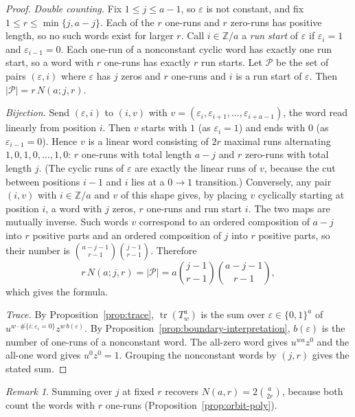 \documentclass[10pt,a4paper]{article}
\numberwithin{equation}{section}
\theoremstyle{plain}
\theoremstyle{definition}
\theoremstyle{remark}
\newtheorem{remark}[theorem]{Remark}
\begin{document}
\begin{proof}
\emph{Double counting.} Fix $1\le j\le a-1$, so $\varepsilon$ is not constant,
and fix $1\le r\le\min\{j,a-j\}$. Each of the $r$ one-runs and $r$ zero-runs has
positive length, so no such words exist for larger $r$. Call $i\in\mathbb{Z}/a$ a
\emph{run start} of $\varepsilon$ if $\varepsilon_i=1$ and $\varepsilon_{i-1}=0$.
Each one-run of a nonconstant cyclic word has exactly one run start, so a word
with $r$ one-runs has exactly $r$ run starts. Let $\mathcal{P}$ be the set of
pairs $(\varepsilon,i)$ where $\varepsilon$ has $j$ zeros and $r$ one-runs and $i$
is a run start of $\varepsilon$. Then $|\mathcal{P}|=r\,N(a;j,r)$.

\emph{Bijection.} Send $(\varepsilon,i)$ to $(i,v)$ with
$v=(\varepsilon_i,\varepsilon_{i+1},\dots,\varepsilon_{i+a-1})$, the word read
linearly from position $i$. Then $v$ starts with $1$ (as $\varepsilon_i=1$) and
ends with $0$ (as $\varepsilon_{i-1}=0$). Hence $v$ is a linear word consisting of
$2r$ maximal runs alternating $1,0,1,0,\dots,1,0$: $r$ one-runs with total length
$a-j$ and $r$ zero-runs with total length $j$. (The cyclic runs of $\varepsilon$
are exactly the linear runs of $v$, because the cut between positions $i-1$ and
$i$ lies at a $0\to1$ transition.) Conversely, any pair $(i,v)$ with
$i\in\mathbb{Z}/a$ and $v$ of this shape gives, by placing $v$ cyclically starting
at position $i$, a word with $j$ zeros, $r$ one-runs and run start $i$. The two
maps are mutually inverse. Such words $v$ correspond to an ordered composition of
$a-j$ into $r$ positive parts and an ordered composition of $j$ into $r$ positive
parts, so their number is $\binom{a-j-1}{r-1}\binom{j-1}{r-1}$. Therefore
\[
r\,N(a;j,r)=|\mathcal{P}|=a\binom{j-1}{r-1}\binom{a-j-1}{r-1},
\]
which gives the formula.

\emph{Trace.} By Proposition~\ref{prop:trace}, $\operatorname{tr}(T_w^{a})$ is
the sum over $\varepsilon\in\{0,1\}^{a}$ of
$u^{w\cdot\#\{i:\varepsilon_i=0\}}\allowbreak z^{w\,b(\varepsilon)}$. By
Proposition~\ref{prop:boundary-interpretation}, $b(\varepsilon)$ is the number of
one-runs of a nonconstant word. The all-zero word gives $u^{wa}z^{0}$ and the
all-one word gives $u^{0}z^{0}=1$. Grouping the nonconstant words by $(j,r)$ gives
the stated sum.
\end{proof}

\begin{remark}
Summing over $j$ at fixed $r$ recovers $N(a,r)=2\binom{a}{2r}$, because both count
the words with $r$ one-runs (Proposition~\ref{prop:orbit-poly}).
\end{remark}
\end{document}
